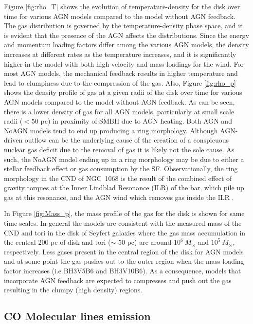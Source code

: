 \documentclass[fleqn,usenatbib]{mnras}
\begin{document}
Figure \ref{fig:rho_T} shows the evolution of temperature-density for the disk over time for various AGN models compared to the model without AGN feedback. The gas distribution is governed by the temperature-density phase space, and it is evident that the presence of the AGN affects the distributions. Since the energy and momentum loading factors differ among the various AGN models, the density increases at different rates as the temperature increases, and it is significantly higher in the model with both high velocity and mass-loadings for the wind. 
For most AGN models, the mechanical feedback results in higher temperature and lead to clumpiness  due to the compression of the gas.
 Also, Figure \ref{fig:rho_p} shows the density profile of gas at a given radii of the disk over time for various AGN models compared to the model without AGN feedback. As can be seen, there is a lower density of gas for all AGN models, particularly at small scale radii ($<$50 pc) in proximity of SMBH due to AGN heating.
Both AGN and NoAGN  models tend to end up producing a ring morphology. Although AGN-driven outflow can be the underlying cause of the creation of a conspicuous nuclear gas deficit due to the removal of gas it is likely not the sole cause. As such, the NoAGN model ending up in a ring morphology may be due to either a stellar feedback effect or gas consumption by the SF.  
Observationally, the ring morphology in the CND of NGC~1068 is the result of the combined effect of gravity torques at the  Inner Lindblad Resonance (ILR) of the bar, which pile up gas at this resonance, and the AGN wind which removes gas inside the ILR \citep[e.g. see][]{Garcia-Burillo2019}.

 
In Figure \ref{fig:Mass_p}, the mass profile of the gas for the disk is shown for same time scales. In general the models are consistent  with the measured mass of the CND and tori in the disk of Seyfert galaxies \citep[i.e $M_{\rm tori}/M_{\rm Disk}\sim$ 0.1; see][and references therein]{Combes2019} where the gas mass accumulation in the central 200 pc of disk and tori ($\sim$ 50 pc) are around $10^6\ M_{\odot}$ and $10^5\ M_{\odot}$, respectively.
Less gases present in the central region of the disk for AGN models and at some point the gas pushes out to the outer region when the mass-loading factor increases (i.e BH3V5B6 and BH3V10B6).   
As a consequence, models that incorporate AGN feedback are expected to compresses and push out the gas resulting in the clumpy (high density) regions.

\subsection{CO Molecular lines emission}
\end{document}
